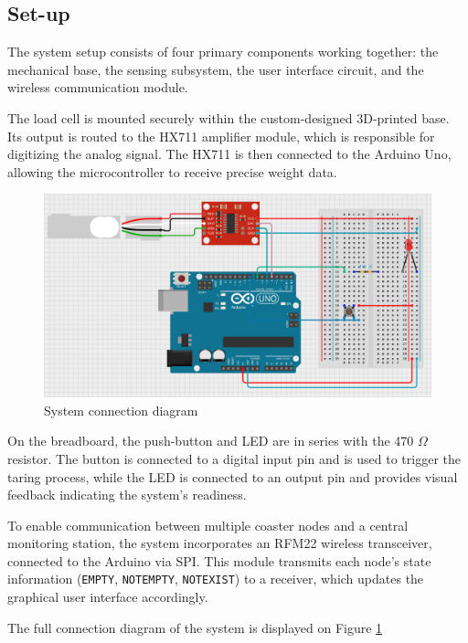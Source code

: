\subsection{Set-up}
The system setup consists of four primary components working together: the mechanical base, the sensing subsystem, the user interface circuit, and the wireless communication module.

The load cell is mounted securely within the custom-designed 3D-printed base. Its output is routed to the HX711 amplifier module, which is responsible for digitizing the analog signal. The HX711 is then connected to the Arduino Uno, allowing the microcontroller to receive precise weight data.

\begin{figure}[H]
    \centering
    \includegraphics[width=\linewidth]{assets/load cell images/circuit.png}
    \caption{System connection diagram}
    \label{fig:circuit}
\end{figure}

On the breadboard, the push-button and LED are in series with the 470 $\Omega$ resistor. The button is connected to a digital input pin and is used to trigger the taring process, while the LED is connected to an output pin and provides visual feedback indicating the system’s readiness.

To enable communication between multiple coaster nodes and a central monitoring station, the system incorporates an RFM22 wireless transceiver, connected to the Arduino via SPI. This module transmits each node’s state information (\texttt{EMPTY}, \texttt{NOTEMPTY}, \texttt{NOTEXIST}) to a receiver, which updates the graphical user interface accordingly.

The full connection diagram of the system is displayed on Figure \ref{fig:circuit}

